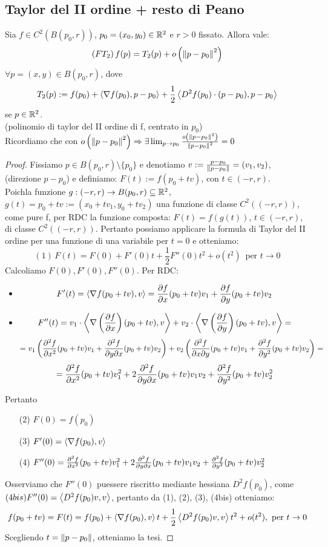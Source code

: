 \subsection{Taylor del II ordine + resto di Peano}
Sia $f \in C^2\left(B(p_0,r)\right)$, $p_0 = (x_0,y_0) \in \mathbb{R}^2$ e $r > 0$ fissato. Allora vale:
$$\left(FT_2\right) f(p) = T_2(p) + o\left(\left\lVert p-p_0\right\rVert^2\right)$$
$\forall p = (x,y) \in B(p_0,r)$, dove 
$$T_2(p) := f(p_0) + \left\langle \nabla f(p_0), p-p_0 \right\rangle + \frac{1}{2} \left\langle D^2f(p_0) \cdot (p-p_0), p-p_0 \right\rangle$$
se $p \in \mathbb{R}^2$. \\
(polinomio di taylor del II ordine di f, centrato in $p_0$) \\
Ricordiamo che con $o\left(\left\lVert p-p_0\right\rVert^2\right) \Rightarrow \exists\lim_{p\to p_0} \frac{o\left(\left\lVert p-p_0\right\rVert^2\right)}{\left\lVert p-p_0\right\rVert^2} = 0$
\begin{proof}
  Fissiamo $p \in B(p_0,r)\setminus \{p_0\}$ e denotiamo $v:= \frac{p-p_0}{\left\lVert p-p_0\right\rVert} = (v_1,v_2)$, (direzione $p-p_0$)
  e definiamo: $F(t) := f(p_0+tv)$, con $t \in \left(-r,r\right)$. \\
  Poich\ace la funzione $g: (-r,r) \to B(p_0,r) \subseteq \mathbb{R}^2$, $g(t) = p_0+tv := (x_0+tv_1, y_0+tv_2)$ \ace una funzione di 
  classe $C^2\left((-r,r)\right)$, come pure f, per RDC la funzione composta:
  $F(t) = f(g(t))$, $t \in (-r,r)$, \ace di classe $C^2((-r,r))$. Pertanto possiamo applicare la formula di Taylor
  del II ordine per una funzione di una variabile per $t=0$ e otteniamo:
  $$(1) \, F(t) = F(0) + F'(0)t + \frac{1}{2}F''(0)t^2 + o(t^2) \, \text{ per } t \to 0$$
  Calcoliamo $F(0), F'(0), F''(0)$. Per RDC:
  \begin{itemize}
    \item $$F'(t) = \left\langle \nabla f(p_0+tv), v \right\rangle = \frac{\partial f}{\partial x}(p_0+tv) v_1 + \frac{\partial f}{\partial y}(p_0+tv) v_2$$
    \item $$F''(t) = v_1 \cdot \left\langle \nabla \left(\frac{\partial f}{\partial x}\right)(p_0+tv), v \right\rangle + 
              v_2 \cdot \left\langle \nabla \left(\frac{\partial f}{\partial y}\right)(p_0+tv), v \right\rangle = $$
          $$= v_1 \left(\frac{\partial^2 f}{\partial x^2}(p_0+tv)v_1 + \frac{\partial^2 f}{\partial y \partial x}(p_0+tv)v_2\right) + 
              v_2 \left( \frac{\partial^2 f}{\partial x \partial y}(p_0+tv)v_1 + \frac{\partial^2 f}{\partial y^2}(p_0+tv)v_2\right) = $$
          $$ = \frac{\partial^2 f}{\partial x^2}(p_0+tv)v_1^2 + 2 \frac{\partial^2 f}{\partial y \partial x}(p_0+tv)v_1 v_2 + 
              \frac{\partial^2 f}{\partial y^2}(p_0 + tv)v_2^2$$
  \end{itemize}
  Pertanto \begin{itemize}
    \item[(2)] $F(0) = f(p_0)$
    \item[(3)] $F'(0) = \left\langle \nabla f(p_0), v \right\rangle$
    \item[(4)] $F''(0) = \frac{\partial^2 f}{\partial x^2}(p_0+tv)v_1^2 + 2 \frac{\partial^2 f}{\partial y \partial x}(p_0+tv)v_1 v_2 + 
    \frac{\partial^2 f}{\partial y^2}(p_0 + tv)v_2^2$  
  \end{itemize}
  Osserviamo che $F''(0)$ pu\aco essere riscritto mediante hessiana $D^2f(p_0)$, come $(4bis) F''(0) = \left\langle D^2f(p_0)v,v \right\rangle$, 
  pertanto da (1), (2), (3), (4bis) otteniamo:
  $$f(p_0+tv) = F(t) = f(p_0) + \left\langle \nabla f(p_0), v \right\rangle t + \frac{1}{2} \left\langle D^2 f(p_0)v, v \right\rangle t^2 + o(t^2) , \text{ per } t \to 0$$
  Scegliendo $t = \left\lVert p-p_0\right\rVert$, otteniamo la tesi.
\end{proof} 
